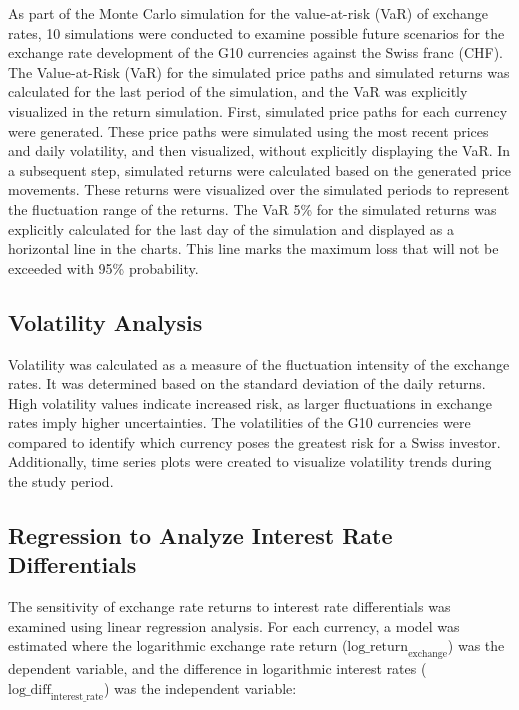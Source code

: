 \documentclass[a4paper, 12pt]{article}
\begin{document}
As part of the Monte Carlo simulation for the value-at-risk (VaR) of exchange rates, 10 simulations were conducted to examine possible future scenarios for the exchange rate development of the G10 currencies against the Swiss franc (CHF). The Value-at-Risk (VaR) for the simulated price paths and simulated returns was calculated for the last period of the simulation, and the VaR was explicitly visualized in the return simulation.
First, simulated price paths for each currency were generated. These price paths were simulated using the most recent prices and daily volatility, and then visualized, without explicitly displaying the VaR.
In a subsequent step, simulated returns were calculated based on the generated price movements. These returns were visualized over the simulated periods to represent the fluctuation range of the returns. The VaR 5\% for the simulated returns was explicitly calculated for the last day of the simulation and displayed as a horizontal line in the charts. This line marks the maximum loss that will not be exceeded with 95\% probability.

\subsection{Volatility Analysis}

Volatility was calculated as a measure of the fluctuation intensity of the exchange rates. It was determined based on the standard deviation of the daily returns. High volatility values indicate increased risk, as larger fluctuations in exchange rates imply higher uncertainties. The volatilities of the G10 currencies were compared to identify which currency poses the greatest risk for a Swiss investor. Additionally, time series plots were created to visualize volatility trends during the study period.

\subsection{Regression to Analyze Interest Rate Differentials}

The sensitivity of exchange rate returns to interest rate differentials was examined using linear regression analysis. For each currency, a model was estimated where the logarithmic exchange rate return (\(\text{log\_return}_{\text{exchange}}\)) was the dependent variable, and the difference in logarithmic interest rates (\(\text{log\_diff}_{\text{interest\_rate}}\)) was the independent variable:
\end{document}
